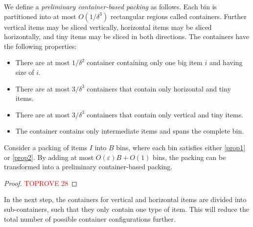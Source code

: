 \documentclass[a4paper,UKenglish,cleveref, autoref, thm-restate]{lipics-v2021}
\newcommand{\eps}{\varepsilon}
\newcommand{\inter}{intermediate\xspace}
\newcommand{\bigy}{big\xspace}
\newcommand{\tin}{tiny\xspace}
\begin{document}
We define a \emph{preliminary container-based packing} as follows.
Each bin is partitioned into at most $O(1/\delta^3)$ rectangular regions called containers. 
Further vertical items may be sliced vertically, horizontal items may be sliced horizontally, and \tin items may be sliced in both directions.
The containers have the following properties:
\begin{itemize}
        \item There are at most $1/\delta^2$ container containing only one \bigy item $i$ and having size of $i$. 
        \item There are at most $3/\delta^3$ containers that contain only horizontal and \tin items. 
        \item There are at most $3/\delta^3$ containers that contain only vertical and \tin items. 
        \item The container contains only \inter items and spans the complete bin.
\end{itemize}

\begin{lemma}
\label{lem:structure-2bp-1}
Consider a packing of items $I$ into $B$ bins, where each bin satisfies either \cref{prop1} or \cref{prop2}.  
By adding at most ${O}(\eps)B+O(1)$ bins, the packing can be transformed into a preliminary container-based packing.
\end{lemma}

\begin{proof}\textcolor{red}{TOPROVE 28}\end{proof}

In the next step, the containers for vertical and horizontal items are divided into sub-containers, such that they only contain one type of item. 
This will reduce the total number of possible container configurations further.
\end{document}
